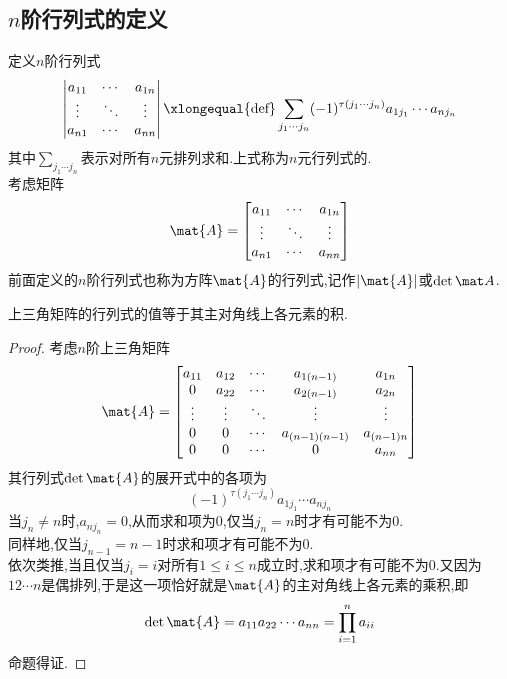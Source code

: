\documentclass{ctexart}
\begin{document}
\subsection{$n$阶行列式的定义}
\begin{definition}[$n$阶行列式]
    定义$n$阶行列式
    \[\begin{vmatrix}
        a_{11}&\cdots&a_{1n}\\
        \vdots&\ddots&\vdots\\
        a_{n1}&\cdots&a_{nn}
    \end{vmatrix}\xlongequal{\text{def}}\sum_{j_1\cdots j_n}(-1)^{\tau\left(j_1\cdots j_n\right)}a_{1j_1}\cdots a_{nj_n}\]
    其中$\displaystyle\sum_{j_1\cdots j_n}$表示对所有$n$元排列求和.上式称为$n$元行列式的.\\
    考虑矩阵
    \[\mat{A}=\begin{bmatrix}
        a_{11}&\cdots&a_{1n}\\
        \vdots&\ddots&\vdots\\
        a_{n1}&\cdots&a_{nn}
    \end{bmatrix}\]
    前面定义的$n$阶行列式也称为方阵$\mat{A}$的行列式,记作$\left|\mat{A}\right|$或$\det\mat A$.
\end{definition}
\begin{theorem}
    上三角矩阵的行列式的值等于其主对角线上各元素的积.
\end{theorem}
\begin{proof}
    考虑$n$阶上三角矩阵
    \[\mat{A}=\begin{bmatrix}
        a_{11}&a_{12}&\cdots&a_{1(n-1)}&a_{1n}\\
        0     &a_{22}&\cdots&a_{2(n-1)}&a_{2n}\\
        \vdots&\vdots&\ddots&\vdots&\vdots\\
        0     &0     &\cdots&a_{(n-1)(n-1)}&a_{(n-1)n}\\
        0     &0     &\cdots&0     &a_{nn}
    \end{bmatrix}\]
    其行列式$\det\mat{A}$的展开式中的各项为
    \[(-1)^{\tau\left(j_1\cdots j_n\right)}a_{1j_1}\cdots a_{nj_n}\]
    当$j_n\neq n$时,$a_{nj_n}=0$,从而求和项为$0$,仅当$j_n=n$时才有可能不为$0$.\\
    同样地,仅当$j_{n-1}=n-1$时求和项才有可能不为$0$.\\
    依次类推,当且仅当$j_i=i$对所有$1\leqslant i\leqslant n$成立时,求和项才有可能不为$0$.又因为$12\cdots n$是偶排列,于是这一项恰好就是$\mat{A}$的主对角线上各元素的乘积,即
    \[\det\mat{A}=a_{11}a_{22}\cdots a_{nn}=\prod_{i=1}^{n}a_{ii}\]
    命题得证.
\end{proof}
\end{document}
